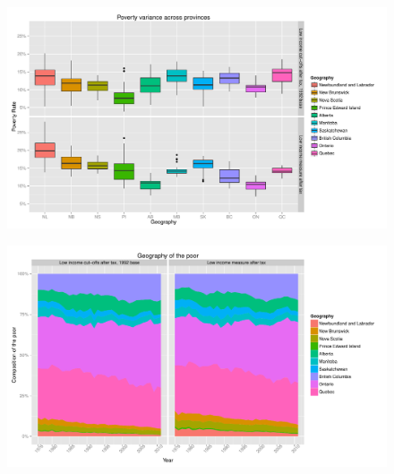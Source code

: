 \documentclass{article}\usepackage[]{graphicx}\usepackage[]{color}
\makeatletter
\def\maxwidth{ %
  \ifdim\Gin@nat@width>\linewidth
    \linewidth
  \else
    \Gin@nat@width
  \fi
}
\newenvironment{knitrout}{}{} %
\makeatother
\begin{document}
\begin{figure}[ht]
\begin{center}
\begin{knitrout}
\color{fgcolor}
\includegraphics[width=\maxwidth]{figure/unnamed-chunk-18} 

\end{knitrout}

\end{center}
\end{figure}
\begin{figure}[ht]
\begin{center}
\begin{knitrout}
\color{fgcolor}
\includegraphics[width=\maxwidth]{figure/unnamed-chunk-19} 

\end{knitrout}

\end{center}
\end{figure}
\end{document}
